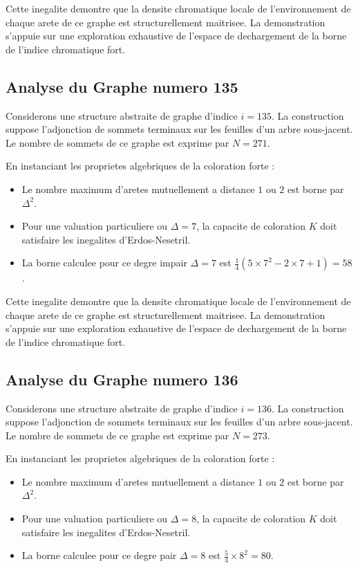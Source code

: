 \documentclass[11pt,a4paper]{article}
\begin{document}
Cette inegalite demontre que la densite chromatique locale de l'environnement de chaque arete de ce graphe est structurellement maitrisee. La demonstration s'appuie sur une exploration exhaustive de l'espace de dechargement de la borne de l'indice chromatique fort.

\subsection{Analyse du Graphe numero 135}
Considerons une structure abstraite de graphe d'indice $i = 135$. La construction suppose l'adjonction de sommets terminaux sur les feuilles d'un arbre sous-jacent. Le nombre de sommets de ce graphe est exprime par $N = 271$.

En instanciant les proprietes algebriques de la coloration forte :
\begin{itemize}
\item Le nombre maximum d'aretes mutuellement a distance $1$ ou $2$ est borne par $\Delta^2$.
\item Pour une valuation particuliere ou $\Delta = 7$, la capacite de coloration $K$ doit satisfaire les inegalites d'Erdos-Nesetril.
\item La borne calculee pour ce degre impair $\Delta = 7$ est $\frac{1}{4}(5 \times 7^2 - 2 \times 7 + 1) = 58$.
\end{itemize}

Cette inegalite demontre que la densite chromatique locale de l'environnement de chaque arete de ce graphe est structurellement maitrisee. La demonstration s'appuie sur une exploration exhaustive de l'espace de dechargement de la borne de l'indice chromatique fort.

\subsection{Analyse du Graphe numero 136}
Considerons une structure abstraite de graphe d'indice $i = 136$. La construction suppose l'adjonction de sommets terminaux sur les feuilles d'un arbre sous-jacent. Le nombre de sommets de ce graphe est exprime par $N = 273$.

En instanciant les proprietes algebriques de la coloration forte :
\begin{itemize}
\item Le nombre maximum d'aretes mutuellement a distance $1$ ou $2$ est borne par $\Delta^2$.
\item Pour une valuation particuliere ou $\Delta = 8$, la capacite de coloration $K$ doit satisfaire les inegalites d'Erdos-Nesetril.
\item La borne calculee pour ce degre pair $\Delta = 8$ est $\frac{5}{4} \times 8^2 = 80$.
\end{itemize}
\end{document}
